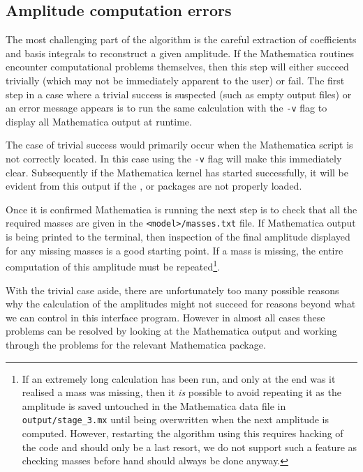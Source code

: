 \subsection{Amplitude computation errors}

The most challenging part of the \mb algorithm is the careful extraction of coefficients and basis integrals to reconstruct a given amplitude.  If the Mathematica routines encounter computational problems themselves, then this step will either succeed trivially (which may not be immediately apparent to the user) or fail.  The first step in a case where a trivial success is suspected (such as empty output files) or an error message appears is to run the same calculation with the \lstinline{-v} flag to display all Mathematica output at runtime.

The case of trivial success would primarily occur when the Mathematica script is not correctly located.  In this case using the \lstinline{-v} flag will make this immediately clear.  Subsequently if the Mathematica kernel has started successfully, it will be evident from this output if the \feyncalcs, \feynarts or \tarcer packages are not properly loaded.

Once it is confirmed Mathematica is running the next step is to check that all the required masses are given in the \lstinline{<model>/masses.txt} file.  If Mathematica output is being printed to the terminal, then inspection of the final amplitude displayed for any missing masses is a good starting point.  If a mass is missing, the entire computation of this amplitude must be repeated\footnote{If an extremely long calculation has been run, and only at the end was it realised a mass was missing, then it \textit{is} possible to avoid repeating it as the amplitude is saved untouched in the Mathematica data file in \lstinline{output/stage_3.mx} until being overwritten when the next amplitude is computed.  However, restarting the algorithm using this requires hacking of the code and should only be a last resort, we do not support such a feature as checking masses before hand should always be done anyway.}.


With the trivial case aside, there are unfortunately too many possible reasons why the calculation of the amplitudes might not succeed for reasons beyond what we can control in this interface program.  However in almost all cases these problems can be resolved by looking at the Mathematica output and working through the problems for the relevant Mathematica package.




